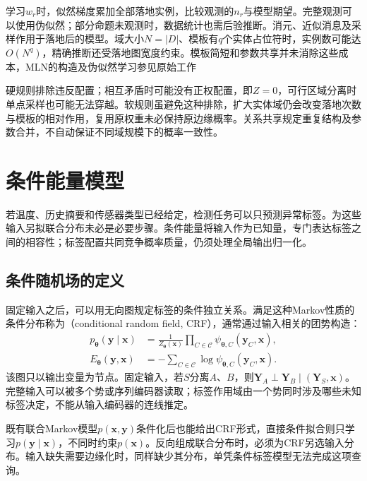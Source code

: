 学习$w_r$时，似然梯度累加全部落地实例，比较观测的$n_r$与模型期望。完整观测可以使用伪似然；部分命题未观测时，数据统计也需后验推断。消元、近似消息及采样作用于落地后的模型。域大小$N=|D|$、模板有$q$个实体占位符时，实例数可能达$O(N^q)$，精确推断还受落地图宽度约束。模板简短和参数共享并未消除这些成本，MLN的构造及伪似然学习参见原始工作

硬规则排除违反配置；相互矛盾时可能没有正权配置，即$Z=0$，可行区域分离时单点采样也可能无法穿越。软规则虽避免这种排除，扩大实体域仍会改变落地次数与模板的相对作用，复用原权重未必保持原边缘概率。关系共享规定重复结构及参数合并，不自动保证不同域规模下的概率一致性。

\section{条件能量模型}
\label{sec:pgm-energy-models-conditional-models}

若温度、历史摘要和传感器类型已经给定，检测任务可以只预测异常标签。为这些输入另拟联合分布未必是必要步骤。条件能量将输入作为已知量，专门表达标签之间的相容性；标签配置共同竞争概率质量，仍须处理全局输出归一化。

\subsection{条件随机场的定义}
\label{sec:pgm-energy-models-crf-definition}

固定输入之后，可以用无向图规定标签的条件独立关系。满足这种Markov性质的条件分布称为（conditional random field, CRF），通常通过输入相关的团势构造：
\begin{equation}
  \begin{aligned}
    p_{\bm{\theta}}(\bm{y}\mid\bm{x})
      &=\frac{1}{Z_{\bm{\theta}}(\bm{x})}
          \prod_{C\in\mathcal{C}}
             \psi_{\bm{\theta},C}(\bm{y}_C,\bm{x}),\\
    E_{\bm{\theta}}(\bm{y},\bm{x})
      &=-\sum_{C\in\mathcal{C}}
             \log\psi_{\bm{\theta},C}(\bm{y}_C,\bm{x}).
  \end{aligned}
  \label{eq:pgm-energy-models-crf-factors}
\end{equation}
该图只以输出变量为节点。固定输入，若$S$分离$A$、$B$，则$\bm{Y}_A\perp\bm{Y}_B\mid(\bm{Y}_S,\bm{x})$。完整输入可以被多个势或序列编码器读取；标签作用域由一个势同时涉及哪些未知标签决定，不能从输入编码器的连线推定。

既有联合Markov模型$p(\bm{x},\bm{y})$条件化后也能给出CRF形式，直接条件拟合则只学习$p(\bm{y}\mid\bm{x})$，不同时约束$p(\bm{x})$。反向组成联合分布时，必须为CRF另选输入分布。输入缺失需要边缘化时，同样缺少其分布，单凭条件标签模型无法完成这项查询。

